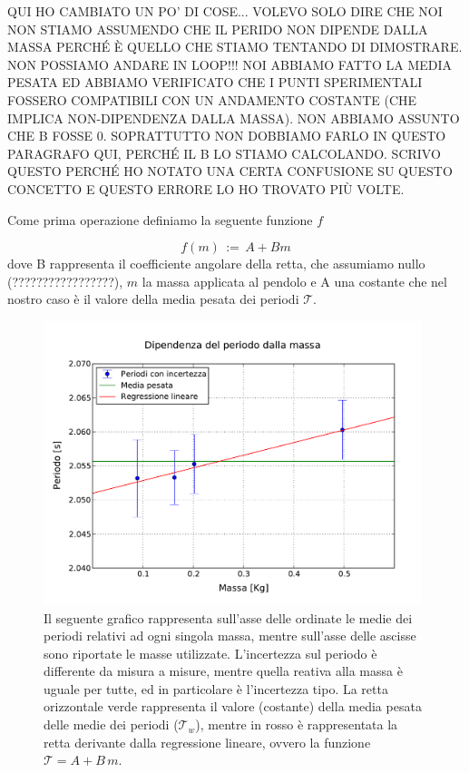QUI HO CAMBIATO UN PO' DI COSE... VOLEVO SOLO DIRE CHE NOI NON STIAMO ASSUMENDO CHE IL PERIDO 
NON DIPENDE DALLA MASSA PERCHÉ È QUELLO CHE STIAMO TENTANDO DI DIMOSTRARE. NON POSSIAMO ANDARE IN LOOP!!!
NOI ABBIAMO FATTO LA MEDIA PESATA ED ABBIAMO VERIFICATO CHE I PUNTI SPERIMENTALI FOSSERO
COMPATIBILI CON UN ANDAMENTO COSTANTE (CHE IMPLICA NON-DIPENDENZA DALLA MASSA). NON ABBIAMO ASSUNTO CHE
B FOSSE 0. SOPRATTUTTO NON DOBBIAMO FARLO IN QUESTO PARAGRAFO QUI, PERCHÉ IL B LO STIAMO CALCOLANDO.
SCRIVO QUESTO PERCHÉ HO NOTATO UNA CERTA CONFUSIONE SU QUESTO CONCETTO E QUESTO ERRORE LO HO TROVATO PIÙ VOLTE.

Come prima operazione definiamo la seguente funzione $f$

\begin{equation}
	f(m) \,:=\, A + B m 
\end{equation}
%
dove B rappresenta il coefficiente angolare della retta, che assumiamo nullo (?????????????????), $m$ la massa applicata al pendolo e A una costante che nel nostro caso è il valore della media pesata dei periodi $\mathcal{T}$.\\

\begin{figure}
    \centering
    \includegraphics[width=110mm]{immagini/masse.pdf}
    \caption{Il seguente grafico rappresenta sull'asse delle ordinate le medie dei periodi relativi ad ogni
        singola massa, mentre sull'asse delle ascisse sono riportate le masse utilizzate. L'incertezza sul periodo
        è differente da misura a misure, mentre quella reativa alla massa è uguale per tutte, ed in particolare è
        l'incertezza tipo. La retta orizzontale verde rappresenta il valore (costante) della media pesata delle medie
        dei periodi ($\mathcal{T}_w$), mentre in rosso è rappresentata la retta derivante dalla regressione lineare,
        ovvero la funzione $\mathcal{T} = A + B\,m$.}
    \label{fig: periodo vs masse}
\end{figure}

